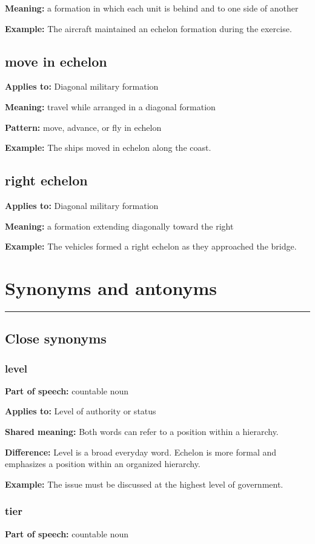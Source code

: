 \documentclass[11pt]{article}
\newcommand{\sectionrule}{\par\vspace{-0.5em}\noindent\textcolor{Accent}{\rule{\linewidth}{0.6pt}}\par}
\begin{document}
\textbf{Meaning:} a formation in which each unit is behind and to one side of another

\textbf{Example:} The aircraft maintained an echelon formation during the exercise.

\subsection{move in echelon}
\textbf{Applies to:} Diagonal military formation

\textbf{Meaning:} travel while arranged in a diagonal formation

\textbf{Pattern:} move, advance, or fly in echelon

\textbf{Example:} The ships moved in echelon along the coast.

\subsection{right echelon}
\textbf{Applies to:} Diagonal military formation

\textbf{Meaning:} a formation extending diagonally toward the right

\textbf{Example:} The vehicles formed a right echelon as they approached the bridge.

\section{Synonyms and antonyms}
\sectionrule
\subsection{Close synonyms}
\subsubsection{level}
\textbf{Part of speech:} countable noun

\textbf{Applies to:} Level of authority or status

\textbf{Shared meaning:} Both words can refer to a position within a hierarchy.

\textbf{Difference:} Level is a broad everyday word. Echelon is more formal and emphasizes a position within an organized hierarchy.

\textbf{Example:} The issue must be discussed at the highest level of government.

\subsubsection{tier}
\textbf{Part of speech:} countable noun
\end{document}
